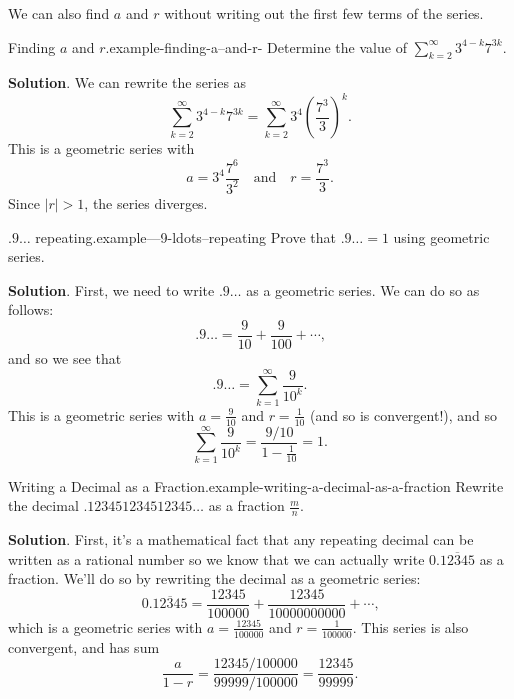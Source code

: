\documentclass[10pt,]{book}
\numberwithin{equation}{section}
\begin{document}
\hypertarget{p-845}{}%
We can also find \(a\) and \(r\) without writing out the first few terms of the series.%
\begin{example}{Finding \(a\) and \(r\).}{example-finding-a--and-r-}%
\hypertarget{p-846}{}%
Determine the value of \(\sum_{k=2}^{\infty}3^{4 - k}7^{3k}\).%
\par\smallskip%
\noindent\textbf{Solution}.\hypertarget{solution-174}{}\quad%
\hypertarget{p-847}{}%
We can rewrite the series as%
\begin{equation*}
\sum_{k=2}^{\infty}3^{4 - k}7^{3k} = \sum_{k=2}^{\infty}3^{4}\left(\frac{7^{3}}{3}\right)^{k}\text{.}
\end{equation*}
This is a geometric series with%
\begin{equation*}
a = 3^{4}\frac{7^{6}}{3^{2}}\quad\text{and}\quad r = \frac{7^{3}}{3}\text{.}
\end{equation*}
Since \(|r| > 1\), the series diverges.%
\end{example}
\begin{example}{\(.9\ldots\) repeating.}{example---9-ldots--repeating}%
\hypertarget{p-848}{}%
Prove that \(.9\ldots = 1\) using geometric series.%
\par\smallskip%
\noindent\textbf{Solution}.\hypertarget{solution-175}{}\quad%
\hypertarget{p-849}{}%
First, we need to write \(.9\ldots\) as a geometric series. We can do so as follows:%
\begin{equation*}
.9\ldots = \frac{9}{10} + \frac{9}{100} + \cdots\text{,}
\end{equation*}
and so we see that%
\begin{equation*}
.9\ldots = \sum_{k=1}^{\infty}\frac{9}{10^{k}}\text{.}
\end{equation*}
This is a geometric series with \(a = \frac{9}{10}\) and \(r = \frac{1}{10}\) (and so is convergent!), and so%
\begin{equation*}
\sum_{k=1}^{\infty}\frac{9}{10^{k}} = \frac{9/10}{1 - \frac{1}{10}} = 1\text{.}
\end{equation*}
%
\end{example}
\begin{example}{Writing a Decimal as a Fraction.}{example-writing-a-decimal-as-a-fraction}%
\hypertarget{p-850}{}%
Rewrite the decimal \(.123451234512345\ldots\) as a fraction \(\frac{m}{n}\).%
\par\smallskip%
\noindent\textbf{Solution}.\hypertarget{solution-176}{}\quad%
\hypertarget{p-851}{}%
First, it's a mathematical fact that any repeating decimal can be written as a rational number so we know that we can actually write \(0.\overline{12345}\) as a fraction. We'll do so by rewriting the decimal as a geometric series:%
\begin{equation*}
0.\overline{12345} = \frac{12345}{100000} + \frac{12345}{10000000000} + \cdots\text{,}
\end{equation*}
which is a geometric series with \(a = \frac{12345}{100000}\) and \(r = \frac{1}{100000}\). This series is also convergent, and has sum%
\begin{equation*}
\frac{a}{1 - r} = \frac{12345/100000}{99999/100000} = \frac{12345}{99999}\text{.}
\end{equation*}
%
\end{example}
\end{document}
